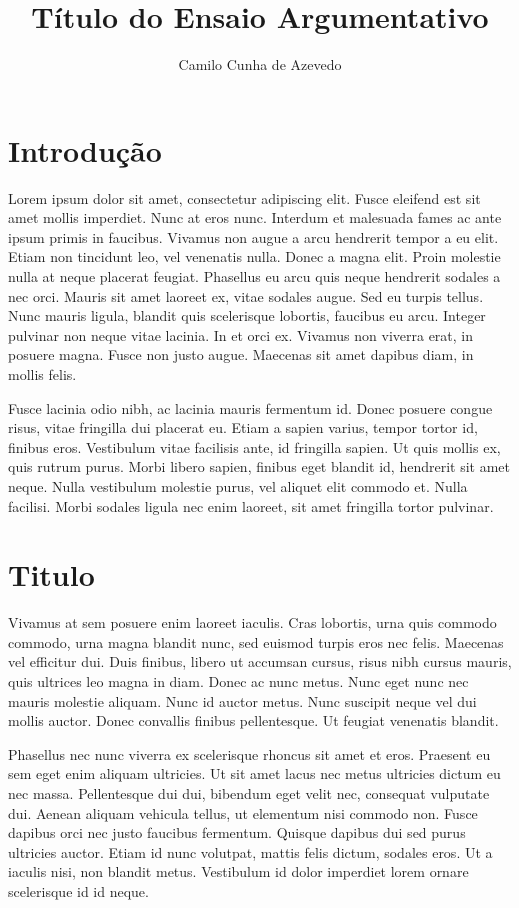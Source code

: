 \documentclass[a4paper, 12pt]{article}
\title{Título do Ensaio Argumentativo}
\author{Camilo Cunha de Azevedo}
\date{}
\begin{document}
\maketitle

\section{Introdução}

Lorem ipsum dolor sit amet, consectetur adipiscing elit. Fusce eleifend est sit amet mollis imperdiet. Nunc at eros nunc. Interdum et malesuada fames ac ante ipsum primis in faucibus. Vivamus non augue a arcu hendrerit tempor a eu elit. Etiam non tincidunt leo, vel venenatis nulla. Donec a magna elit. Proin molestie nulla at neque placerat feugiat. Phasellus eu arcu quis neque hendrerit sodales a nec orci. Mauris sit amet laoreet ex, vitae sodales augue. Sed eu turpis tellus. Nunc mauris ligula, blandit quis scelerisque lobortis, faucibus eu arcu. Integer pulvinar non neque vitae lacinia. In et orci ex. Vivamus non viverra erat, in posuere magna. Fusce non justo augue. Maecenas sit amet dapibus diam, in mollis felis.

Fusce lacinia odio nibh, ac lacinia mauris fermentum id. Donec posuere congue risus, vitae fringilla dui placerat eu. Etiam a sapien varius, tempor tortor id, finibus eros. Vestibulum vitae facilisis ante, id fringilla sapien. Ut quis mollis ex, quis rutrum purus. Morbi libero sapien, finibus eget blandit id, hendrerit sit amet neque. Nulla vestibulum molestie purus, vel aliquet elit commodo et. Nulla facilisi. Morbi sodales ligula nec enim laoreet, sit amet fringilla tortor pulvinar. 

\section{Titulo}

Vivamus at sem posuere enim laoreet iaculis. Cras lobortis, urna quis commodo commodo, urna magna blandit nunc, sed euismod turpis eros nec felis. Maecenas vel efficitur dui. Duis finibus, libero ut accumsan cursus, risus nibh cursus mauris, quis ultrices leo magna in diam. Donec ac nunc metus. Nunc eget nunc nec mauris molestie aliquam. Nunc id auctor metus. Nunc suscipit neque vel dui mollis auctor. Donec convallis finibus pellentesque. Ut feugiat venenatis blandit.

Phasellus nec nunc viverra ex scelerisque rhoncus sit amet et eros. Praesent eu sem eget enim aliquam ultricies. Ut sit amet lacus nec metus ultricies dictum eu nec massa. Pellentesque dui dui, bibendum eget velit nec, consequat vulputate dui. Aenean aliquam vehicula tellus, ut elementum nisi commodo non. Fusce dapibus orci nec justo faucibus fermentum. Quisque dapibus dui sed purus ultricies auctor. Etiam id nunc volutpat, mattis felis dictum, sodales eros. Ut a iaculis nisi, non blandit metus. Vestibulum id dolor imperdiet lorem ornare scelerisque id id neque.
\end{document}
